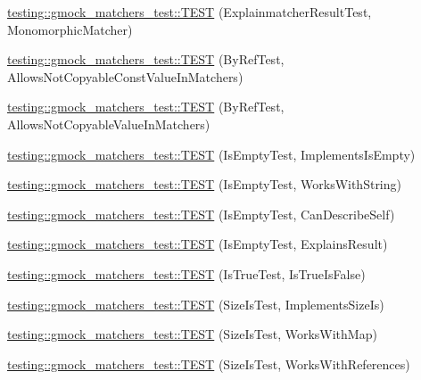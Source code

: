 \begin{DoxyCompactItemize}
\mbox{\hyperlink{namespacetesting_1_1gmock__matchers__test_a102b10d9064f6e0037e3f3f0c3e76e22}{testing\+::gmock\+\_\+matchers\+\_\+test\+::\+T\+E\+ST}} (Explainmatcher\+Result\+Test, Monomorphic\+Matcher)
\item 
\mbox{\hyperlink{namespacetesting_1_1gmock__matchers__test_aab82f120c70dc7d8bc2fd74ac6897486}{testing\+::gmock\+\_\+matchers\+\_\+test\+::\+T\+E\+ST}} (By\+Ref\+Test, Allows\+Not\+Copyable\+Const\+Value\+In\+Matchers)
\item 
\mbox{\hyperlink{namespacetesting_1_1gmock__matchers__test_a5ed7b822889a34f018c2ba8f21941fd4}{testing\+::gmock\+\_\+matchers\+\_\+test\+::\+T\+E\+ST}} (By\+Ref\+Test, Allows\+Not\+Copyable\+Value\+In\+Matchers)
\item 
\mbox{\hyperlink{namespacetesting_1_1gmock__matchers__test_ab63796f77c7572f6f1aef01cb140f99e}{testing\+::gmock\+\_\+matchers\+\_\+test\+::\+T\+E\+ST}} (Is\+Empty\+Test, Implements\+Is\+Empty)
\item 
\mbox{\hyperlink{namespacetesting_1_1gmock__matchers__test_a22f0cacccee169b7390741b9815f4281}{testing\+::gmock\+\_\+matchers\+\_\+test\+::\+T\+E\+ST}} (Is\+Empty\+Test, Works\+With\+String)
\item 
\mbox{\hyperlink{namespacetesting_1_1gmock__matchers__test_adcf3743190f973f2773296d0772e8950}{testing\+::gmock\+\_\+matchers\+\_\+test\+::\+T\+E\+ST}} (Is\+Empty\+Test, Can\+Describe\+Self)
\item 
\mbox{\hyperlink{namespacetesting_1_1gmock__matchers__test_a1c168c284000d05d63bf5e9df10d1b7c}{testing\+::gmock\+\_\+matchers\+\_\+test\+::\+T\+E\+ST}} (Is\+Empty\+Test, Explains\+Result)
\item 
\mbox{\hyperlink{namespacetesting_1_1gmock__matchers__test_a1cd170a421c94a8edf104b72ee1f396d}{testing\+::gmock\+\_\+matchers\+\_\+test\+::\+T\+E\+ST}} (Is\+True\+Test, Is\+True\+Is\+False)
\item 
\mbox{\hyperlink{namespacetesting_1_1gmock__matchers__test_abe619d5d1910e1f2e8b169622d1d8592}{testing\+::gmock\+\_\+matchers\+\_\+test\+::\+T\+E\+ST}} (Size\+Is\+Test, Implements\+Size\+Is)
\item 
\mbox{\hyperlink{namespacetesting_1_1gmock__matchers__test_aea77169d6c56b88b5c99273d5a2bc0f2}{testing\+::gmock\+\_\+matchers\+\_\+test\+::\+T\+E\+ST}} (Size\+Is\+Test, Works\+With\+Map)
\item 
\mbox{\hyperlink{namespacetesting_1_1gmock__matchers__test_a53bcd375786f69d889a8e8891ff8e0b0}{testing\+::gmock\+\_\+matchers\+\_\+test\+::\+T\+E\+ST}} (Size\+Is\+Test, Works\+With\+References)

\end{DoxyCompactItemize}
